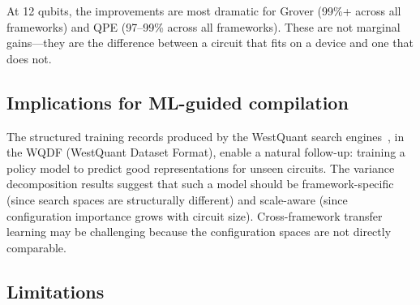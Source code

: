 \documentclass[11pt,a4paper]{article}
\begin{document}
At 12 qubits, the improvements are most dramatic for Grover (99\%+ across all frameworks) and QPE (97--99\% across all frameworks). These are not marginal gains---they are the difference between a circuit that fits on a device and one that does not.

\subsection{Implications for ML-guided compilation}

The structured training records produced by the WestQuant search engines~\cite{ref12}, in the WQDF (WestQuant Dataset Format), enable a natural follow-up: training a policy model to predict good representations for unseen circuits. The variance decomposition results suggest that such a model should be framework-specific (since search spaces are structurally different) and scale-aware (since configuration importance grows with circuit size). Cross-framework transfer learning may be challenging because the configuration spaces are not directly comparable.

\subsection{Limitations}
\end{document}
